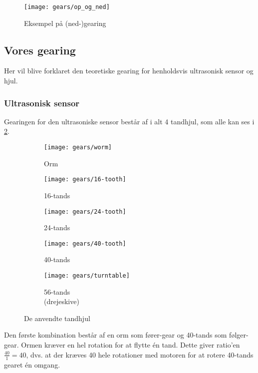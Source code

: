 \begin{figure}[h]
\centering
\texttt{[image: gears/op\_og\_ned]}
\caption{Eksempel på (ned-)gearing}
\label{gearing:nedgearing}
\end{figure}

\subsection{Vores gearing}
Her vil blive forklaret den teoretiske gearing for henholdsvis ultrasonisk sensor og hjul.

\subsubsection{Ultrasonisk sensor}
Gearingen for den ultrasoniske sensor består af i alt 4 tandhjul, som alle kan ses i \cref{gearing:tandhjul}.

\begin{figure}[h] %
\centering
\begin{subfigure}[b]{.19\textwidth}
\centering
\texttt{[image: gears/worm]}
\caption{Orm}
\end{subfigure}
\begin{subfigure}[b]{.19\textwidth}
\centering
\texttt{[image: gears/16-tooth]}
\caption{16-tands}
\end{subfigure}
\begin{subfigure}[b]{.19\textwidth}
\centering
\texttt{[image: gears/24-tooth]}
\caption{24-tands}
\end{subfigure}
\begin{subfigure}[b]{.19\textwidth}
\centering
\texttt{[image: gears/40-tooth]}
\caption{40-tands}
\end{subfigure}
\begin{subfigure}[b]{.19\textwidth}
\centering
\texttt{[image: gears/turntable]}
\caption{56-tands \\ \centering (drejeskive)}
\end{subfigure}
\caption{De anvendte tandhjul}
\label{gearing:tandhjul}
\end{figure}

Den første kombination består af en orm som fører-gear og 40-tands som følger-gear.
Ormen kræver en hel rotation for at flytte én tand.
Dette giver ratio'en $\frac{40}{1} = 40$, dvs. at der kræves 40 hele rotationer med motoren for at rotere 40-tands gearet én omgang.

